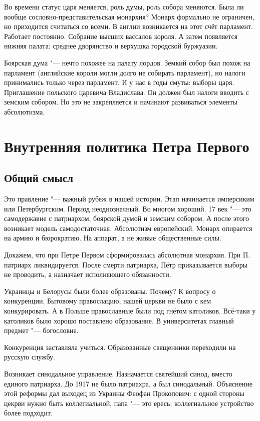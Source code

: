 Во времени статус царя меняется, роль думы, роль собора меняются. Была ли вообще сословно-представительская монархия? Монарх формально не ограничен, но приходится считаться со всеми. В англии возникается на этот счёт парламент. Работает постоянно. Собрание высших вассалов короля. А затем появляется нижняя палата: среднее дворянство и верхушка городской буржуазии.

Боярская дума "--- нечто похожее на палату лордов. Земкий собор был похож на парламент (английские короли могли долго не собирать парламент), но налоги принимались только через парламент.
И у нас в годы смуты: выборы царя. Приглашение польского царевича Владислава. Он должен был налоги вводить с земским собором. Но это не закрепляется и начинают развиваться элементы абсолютизма.

\section{Внутренняя политика Петра Первого}
\subsection{Общий смысл}
Это правление "--- важный рубеж в нашей истории. Этап начинается имперсиким или Петербургским. Период неоднозначный. Во многом хороший. 17 век "--- это самодержавие с патриархом, боярской думой и земским собором. А после этого возникает модель самодостаточная. Абсолютизм европейский. Монарх опирается на армию и бюрократию. На аппарат, а не живые общественные силы.

Докажем, что при Петре Первом сформировалась абсолютная монархия. При П. патриарх ликвидируется. После смерти патриарха, Пётр приказывается выборы не проводить, а назначает исполняющего обязанности.

Украинцы и Белорусы были более образованы. Почему? К вопросу о конкуренции. Бытовому правослацию, нашей церкви не было с кем конкурировать. А в Польше православные были под гнётом католиков. Всё-таки у католиков было хорошо поставлено образование. В университетах главный предмет "--- богословие. 

Конкуренция заставляла учиться. Образованные священники переходили на русскую службу.

Возникает синодальное управление. Назначается святейший синод, вместо единого патриарха. До 1917 не было патриахра, а был синодальный. Объяснение этой реформы дал выходец из Украины Феофан Прокопович: с одной стороны цекрви нужно быть коллегиальной, папа "--- это ересь; коллегиальное устройство более подходит.

